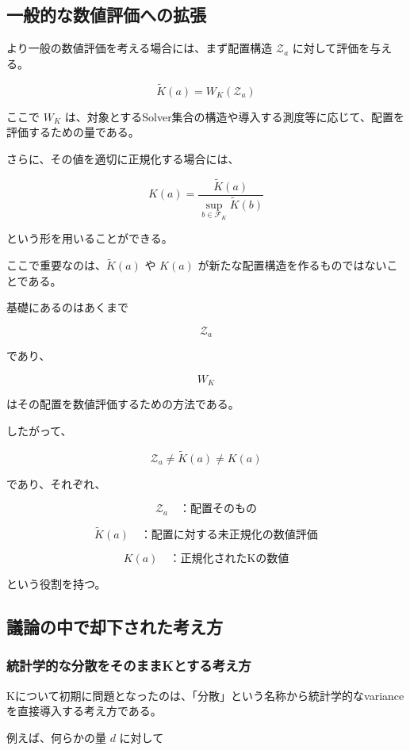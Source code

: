 \subsection{一般的な数値評価への拡張}

より一般の数値評価を考える場合には、まず配置構造 $\mathcal{Z}_a$ に対して評価を与える。

\[
\boxed{
\widetilde{K}(a)=W_K(\mathcal{Z}_a)
}
\]

ここで $W_K$ は、対象とするSolver集合の構造や導入する測度等に応じて、配置を評価するための量である。

さらに、その値を適切に正規化する場合には、

\[
\boxed{
K(a) = \frac{\widetilde{K}(a)}{\sup_{b\in\mathcal{F}_K}\widetilde{K}(b)}
}
\]

という形を用いることができる。

ここで重要なのは、$\widetilde{K}(a)$ や $K(a)$ が新たな配置構造を作るものではないことである。

基礎にあるのはあくまで

\[
\mathcal{Z}_a
\]

であり、

\[
W_K
\]

はその配置を数値評価するための方法である。

したがって、

\[
\boxed{
\mathcal{Z}_a
\neq
\widetilde{K}(a)
\neq
K(a)
}
\]

であり、それぞれ、

\[
\mathcal{Z}_a
\quad\text{：配置そのもの}
\]

\[
\widetilde{K}(a)
\quad\text{：配置に対する未正規化の数値評価}
\]

\[
K(a)
\quad\text{：正規化されたKの数値}
\]

という役割を持つ。

\subsection{議論の中で却下された考え方}

\subsubsection{統計学的な分散をそのままKとする考え方}

Kについて初期に問題となったのは、「分散」という名称から統計学的なvarianceを直接導入する考え方である。

例えば、何らかの量 $d$ に対して

